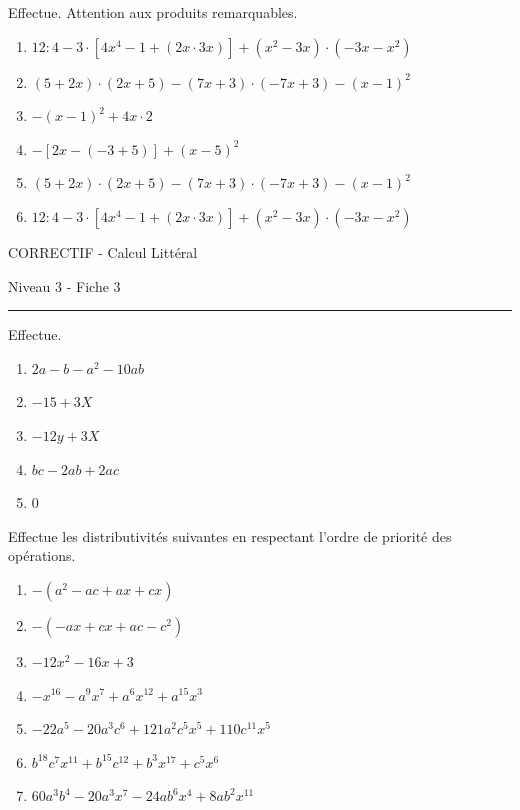 \documentclass[12pt,parskip=half-, twoside=semi]{scrartcl}
\begin{document}
\begin{exercise}Effectue. Attention aux produits remarquables.
  \begin{enumerate}
      \item $12: 4-3 \cdot\left[4 x^4-1+(2 x \cdot 3 x)\right]+\left(x^2-3 x\right) \cdot\left(-3 x-x^2\right)$
      \item $(5+2 x) \cdot(2 x+5)-(7 x+3) \cdot(-7 x+3)-(x-1)^2$
      \item $-(x-1)^2+4 x \cdot 2$
      \item $-[2 x-(-3+5)]+(x-5)^2$
      \item $(5+2 x) \cdot(2 x+5)-(7 x+3) \cdot(-7 x+3)-(x-1)^2$
      \item $12: 4-3 \cdot\left[4 x^4-1+(2 x \cdot 3 x)\right]+\left(x^2-3 x\right) \cdot\left(-3 x-x^2\right)$
  \end{enumerate}
\end{exercise}


\newpage 
\begin{center}
  \bfseries
  \begin{Huge}
    CORRECTIF - Calcul Littéral
  \end{Huge}
  \smallbreak
  \begin{large}
    Niveau 3  - Fiche 3
  \end{large}
  \smallbreak
  \rule[10pt]{.5\linewidth}{1 pt}
\end{center}

\setcounter{exercise}{0}

\begin{exercise}Effectue.
  \begin{enumerate}[cols=2]
    \item $2a-b-a^2-10ab$
    \item $-15+3X$
    \item $-12y+3X$
    \item $bc-2ab+2ac$
    \item $0$
  \end{enumerate}
\end{exercise}

\begin{exercise}Effectue les distributivités suivantes en respectant l'ordre de priorité des opérations.
  \begin{enumerate}[cols=2]
     \item $-(a^2-ac+ax+cx)$
     \item $-(-ax+cx+ac-c^2)$
     \item $-12x^2-16x+3$
     \item $-x^{16}-a^9x^7+a^6x^{12}+a^{15}x^3$
     \item $-22a^5-20a^3c^6+121a^2c^5x^5+110c^{11}x^5$
     \item $b^18c^7x^{11}+b^{15}c{^12}+b^3x^{17}+c^5x^6$
     \item $60a^3b^4-20a^3x^7-24ab^6x^4+8ab^2x^{11}$
  \end{enumerate}
\end{exercise}
\end{document}
